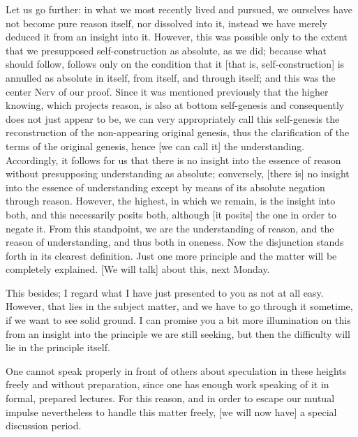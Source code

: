 Let us go further:
in what we most recently lived and pursued,
we ourselves have not become pure reason itself,
nor dissolved into it, instead we have merely
deduced it from an insight into it.
However, this was possible only to the extent
that we presupposed self-construction as absolute, as we did;
because what should follow, follows only
on the condition that it [that is, self-construction] is
annulled as absolute in itself, from itself, and through itself;
and this was the center {Nerv} of our proof.
Since it was mentioned previously that the higher knowing,
which projects reason, is also at bottom self-genesis
and consequently does not just appear to be,
we can very appropriately call this self-genesis
the reconstruction of the non-appearing original genesis,
thus the clarification of the terms of the original genesis,
hence [we can call it] the understanding.
Accordingly, it follows for us that
there is no insight into the essence of reason
without presupposing understanding as absolute;
conversely, [there is] no insight into
the essence of understanding except by
means of its absolute negation through reason.
However, the highest, in which we remain,
is the insight into both,
and this necessarily posits both,
although [it posits] the one in order to negate it.
From this standpoint, we are the understanding of reason,
and the reason of understanding, and thus both in oneness.
Now the disjunction stands forth in its clearest definition.
Just one more principle and the matter will be completely explained.
[We will talk] about this, next Monday.

This besides; I regard what I have just
presented to you as not at all easy.
However, that lies in the subject matter,
and we have to go through it sometime,
if we want to see solid ground.
I can promise you a bit more illumination on this
from an insight into the principle we are still seeking,
but then the difficulty will lie in the principle itself.

One cannot speak properly in front of others about
speculation in these heights freely and without preparation,
since one has enough work speaking of it in formal, prepared lectures.
For this reason, and in order to escape our
mutual impulse nevertheless to handle this matter freely,
[we will now have] a special discussion period.
